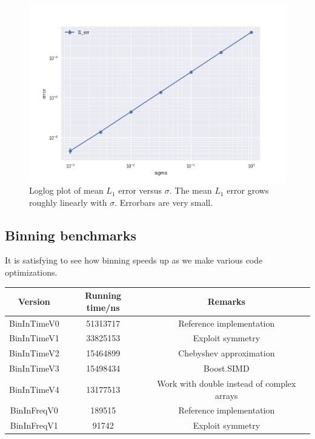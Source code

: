 \documentclass[10pt]{article}
\begin{document}
\begin{figure}
\centering
\includegraphics[scale=0.6]{./graph/noise}
\caption{Loglog plot of mean $L_1$ error versus $\sigma$. The mean $L_1$ error grows roughly linearly with $\sigma$. Errorbars are very small. \label{fig:noise}}
\end{figure}

\subsection{Binning benchmarks}
It is satisfying to see how binning speeds up as we make various code optimizations.

\begin{center}
\begin{tabular}{|c|c|c|}
\hline
Version & Running time/ns & Remarks \\
\hline
BinInTimeV0 & 51313717 & Reference implementation \\
BinInTimeV1 & 33825153 & Exploit symmetry \\
BinInTimeV2 & 15464899 & Chebyshev approximation \\
BinInTimeV3 & 15498434 & Boost.SIMD \\
BinInTimeV4 & 13177513 & Work with double instead of complex arrays \\
BinInFreqV0 & 189515 & Reference implementation \\
BinInFreqV1 & 91742 & Exploit symmetry\\
\hline
\end{tabular}
\end{center}



\end{document}

